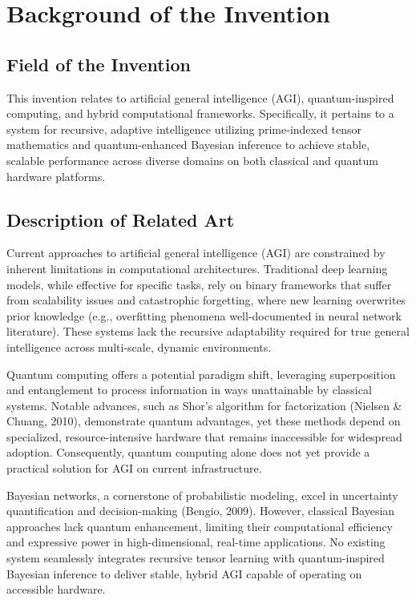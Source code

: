 \documentclass[12pt]{article}
\begin{document}
\linenumbers
\section{Background of the Invention}

\subsection{Field of the Invention}
This invention relates to artificial general intelligence (AGI), quantum-inspired computing, and hybrid computational frameworks. Specifically, it pertains to a system for recursive, adaptive intelligence utilizing prime-indexed tensor mathematics and quantum-enhanced Bayesian inference to achieve stable, scalable performance across diverse domains on both classical and quantum hardware platforms.

\subsection{Description of Related Art}
Current approaches to artificial general intelligence (AGI) are constrained by inherent limitations in computational architectures. Traditional deep learning models, while effective for specific tasks, rely on binary frameworks that suffer from scalability issues and catastrophic forgetting, where new learning overwrites prior knowledge (e.g., overfitting phenomena well-documented in neural network literature). These systems lack the recursive adaptability required for true general intelligence across multi-scale, dynamic environments.

Quantum computing offers a potential paradigm shift, leveraging superposition and entanglement to process information in ways unattainable by classical systems. Notable advances, such as Shor’s algorithm for factorization (Nielsen \& Chuang, 2010), demonstrate quantum advantages, yet these methods depend on specialized, resource-intensive hardware that remains inaccessible for widespread adoption. Consequently, quantum computing alone does not yet provide a practical solution for AGI on current infrastructure.

Bayesian networks, a cornerstone of probabilistic modeling, excel in uncertainty quantification and decision-making (Bengio, 2009). However, classical Bayesian approaches lack quantum enhancement, limiting their computational efficiency and expressive power in high-dimensional, real-time applications. No existing system seamlessly integrates recursive tensor learning with quantum-inspired Bayesian inference to deliver stable, hybrid AGI capable of operating on accessible hardware.
\end{document}
